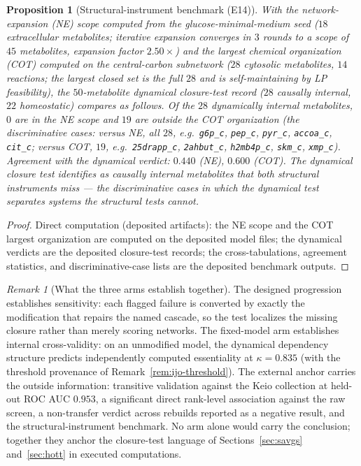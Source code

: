 \documentclass[11pt,a4paper]{article}
\theoremstyle{plain}
\newtheorem{proposition}[theorem]{Proposition}
\theoremstyle{definition}
\theoremstyle{remark}
\newtheorem{remark}[theorem]{Remark}
\begin{document}
\begin{proposition}[Structural-instrument benchmark (E14)]
\label{prop:e14-structural}
With the network-expansion (NE) scope computed from the
glucose-minimal-medium seed ($18$ extracellular metabolites;
iterative expansion converges in $3$ rounds to a scope of $45$
metabolites, expansion factor $2.50\times$) and the largest
chemical organization (COT) computed on the central-carbon
subnetwork ($28$ cytosolic metabolites, $14$ reactions; the
largest closed set is the full $28$ and is self-maintaining by LP
feasibility), the $50$-metabolite dynamical closure-test record
($28$ causally internal, $22$ homeostatic) compares as follows.
Of the $28$ dynamically internal metabolites, $0$ are in the NE
scope and $19$ are outside the COT organization (the discriminative
cases: versus NE, all $28$, e.g.\ \texttt{g6p\_c},
\texttt{pep\_c}, \texttt{pyr\_c}, \texttt{accoa\_c},
\texttt{cit\_c}; versus COT, $19$, e.g.\ \texttt{25drapp\_c},
\texttt{2ahbut\_c}, \texttt{h2mb4p\_c}, \texttt{skm\_c},
\texttt{xmp\_c}). Agreement with the dynamical verdict: $0.440$
(NE), $0.600$ (COT). The dynamical closure test identifies as
causally internal metabolites that both structural instruments
miss --- the discriminative cases in which the dynamical test
separates systems the structural tests cannot.
\end{proposition}

\begin{proof}
Direct computation (deposited artifacts): the NE scope and the COT
largest organization are computed on the deposited model files;
the dynamical verdicts are the deposited closure-test records; the
cross-tabulations, agreement statistics, and discriminative-case
lists are the deposited benchmark outputs.
\end{proof}

\begin{remark}[What the three arms establish together]
\label{rem:network-battery-reading}
The designed progression establishes sensitivity: each flagged
failure is converted by exactly the modification that repairs the
named cascade, so the test localizes the missing closure rather
than merely scoring networks. The fixed-model arm establishes
internal cross-validity: on an unmodified model, the dynamical
dependency structure predicts independently
computed essentiality at $\kappa=0.835$ (with the threshold
provenance of Remark~\ref{rem:ijo-threshold}). The external anchor
carries the outside information: transitive validation against the
Keio collection at held-out ROC AUC $0.953$, a significant direct
rank-level association against the raw screen, a non-transfer
verdict across rebuilds reported as a negative result, and the
structural-instrument benchmark. No arm alone would carry the conclusion; together they
anchor the closure-test language of
Sections~\ref{sec:savgs} and~\ref{sec:hott} in executed
computations.
\end{remark}
\end{document}
